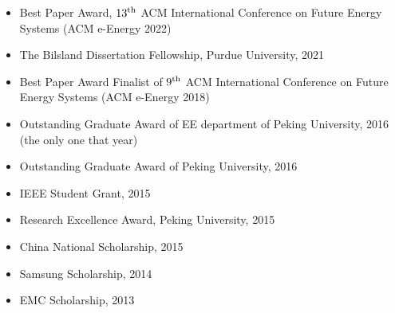 \documentclass[10pt,letter]{article}
\begin{document}
\begin{small}
\begin{itemize}
    \item Best Paper Award, $13\textsuperscript{th}$ ACM International Conference on Future Energy Systems (ACM e-Energy 2022)

    \item The Bilsland Dissertation Fellowship, Purdue University, 2021

	\item Best Paper Award Finalist of $9\textsuperscript{th}$ ACM International Conference on Future Energy Systems (ACM e-Energy 2018)

	\item Outstanding Graduate Award of EE department of Peking University, 2016 (the only one that year)
 
	\item Outstanding Graduate Award of Peking University, 2016
	
	\item IEEE Student Grant, 2015
	
	\item Research Excellence Award, Peking University, 2015
	
	
	
	\item China National Scholarship, 2015
	
	\item Samsung Scholarship, 2014
	
	\item EMC Scholarship, 2013

\end{itemize}


\lhead{\textcolor{gray}{\it Peizhong Ju}}
\fancyfoot[C]{}




\end{small}
\end{document}
